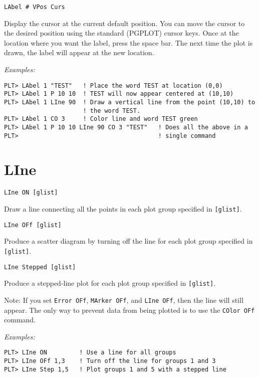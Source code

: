 \medskip
\begin{verbatim}
LAbel # VPos Curs
\end{verbatim}
   Display the cursor at the current default position.  You can move
the cursor to the desired position using the standard (PGPLOT) cursor
keys.  Once at the location where you want the label, press the space
bar.  The next time the plot is drawn, the label will appear at the
new location.

\medskip\noindent
{\em Examples:}
\begin{verbatim}
PLT> LAbel 1 "TEST"   ! Place the word TEST at location (0,0)
PLT> LAbel 1 P 10 10  ! TEST will now appear centered at (10,10)
PLT> LAbel 1 LIne 90  ! Draw a vertical line from the point (10,10) to
                      ! the word TEST.
PLT> LAbel 1 CO 3     ! Color line and word TEST green
PLT> LAbel 1 P 10 10 LIne 90 CO 3 "TEST"   ! Does all the above in a
PLT>                                       ! single command
\end{verbatim}

\section*{LIne}
\begin{verbatim}
LIne ON [glist]
\end{verbatim}
   Draw a line connecting all the points in each plot group specified
in {\tt [glist]}.

\medskip
\begin{verbatim}
LIne OFf [glist]
\end{verbatim}
   Produce a scatter diagram by turning off the line for each plot
group specified in {\tt [glist]}.

\medskip
\begin{verbatim}
LIne Stepped [glist]
\end{verbatim}
   Produce a stepped-line plot for each plot group specified in {\tt [glist]}.

Note:  If you set {\tt Error~OFf}, {\tt MArker~OFf}, and {\tt LIne~OFf}, then
the line will still appear.  The only way to prevent data from being
plotted is to use the {\tt COlor~OFf} command.

\medskip\noindent
{\em Examples:}
\begin{verbatim}
PLT> LIne ON         ! Use a line for all groups
PLT> LIne OFf 1,3    ! Turn off the line for groups 1 and 3
PLT> LIne Step 1,5   ! Plot groups 1 and 5 with a stepped line
\end{verbatim}

